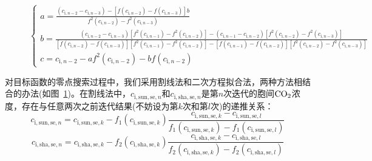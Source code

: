 {\begin{figure}[htbp]
{$\begin{cases}a=\frac{\left(c_{{\mathrm i},n-2}-c_{{\mathrm i},n-3}\right)-\left[f\left(c_{{\mathrm i},n-2}\right)-f\left(c_{{\mathrm i},n-3}\right)\right]b}{f^2\left(c_{{\mathrm i},n-2}\right)-f^2\left(c_{{\mathrm i},n-3}\right)}\\
b=\frac{\left(c_{{\mathrm i},n-2}-c_{{\mathrm i},n-3}\right)\left[f^2\left(c_{{\mathrm i},n-1}\right)-f^2\left(c_{{\mathrm i},n-2}\right)\right]-\left(c_{{\mathrm i},n-1}-c_{{\mathrm i},n-2}\right)\left[f^2\left(c_{{\mathrm i},n-2}\right)-f^2\left(c_{{\mathrm i},n-3}\right)\right]}{\left[f\left(c_{{\mathrm i},n-2}\right)-f\left(c_{{\mathrm i},n-3}\right)\right]\left[f^2\left(c_{{\mathrm i},n-1}\right)-f^2\left(c_{{\mathrm i},n-2}\right)\right]-\left[f\left(c_{{\mathrm i},n-1}\right)-f\left(c_{{\mathrm i},n-2}\right)\right]\left[f^2\left(c_{{\mathrm i},n-2}\right)-f^2\left(c_{{\mathrm i},n-3}\right)\right]}\\
c=c_{{\mathrm i},n-2}-af^2\left(c_{{\mathrm i},n-2}\right)-bf\left(c_{{\mathrm i},n-2}\right)\end{cases}$}
\label{fig:光合气孔耦合模型数值解法示意图}
\end{figure}
}

对目标函数的零点搜索过程中，我们采用割线法和二次方程拟合法，两种方法相结合的办法(如图~\ref{fig:光合气孔耦合模型数值解法示意图})。在割线法中，$c_{\mathrm{i,sun,se},n}$和$c_{\mathrm{i,sha,se},n}$是第$n$次迭代的胞间$\rm CO_2$浓度，存在与任意两次之前迭代结果(不妨设为第$k$次和第$l$次)的递推关系：
\begin{equation}\label{cisunn}
c_{\mathrm{i,sun,se},n}=c_{\mathrm{i,sun,se},k}-f_{1}\left(c_{\mathrm{i,sun,se},k}\right)\frac{c_{\mathrm{i,sun,se},k}-c_{\mathrm{i,sun,se},l}}{ f_{1}\left(c_{\mathrm{i,sun,se},k}\right)-f_{1}\left(c_{\mathrm{i,sun,se},l}\right)}
\end{equation}
\begin{equation}\label{cishan}
c_{\mathrm{i,sha,se},n}=c_{\mathrm{i,sha,se},k}-f_{2}\left(c_{\mathrm{i,sha,se},k}\right)\frac{c_{\mathrm{i,sha,se},k}-c_{\mathrm{i,sha,se},l}}{ f_{2}\left(c_{\mathrm{i,sha,se},k}\right)-f_{2}\left(c_{\mathrm{i,sha,se},l}\right)}
\end{equation}

